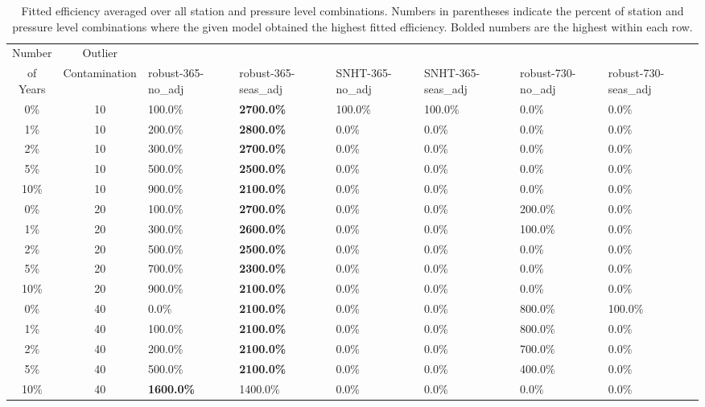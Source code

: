 \documentclass[12pt]{article}
\begin{document}
\begin{landscape}
\begin{table}[ht]
\centering
\begin{tabular}{cc|llllll}
  \hline
Number & Outlier & & & & & &\\ 
of Years & Contamination & robust-365-no\_adj &  robust-365-seas\_adj & SNHT-365-no\_adj &  SNHT-365-seas\_adj & robust-730-no\_adj & robust-730-seas\_adj\\ 

  \hline
0\% &  10 & 100.0\% & \textbf{2700.0\%} & 100.0\% & 100.0\% & 0.0\% & 0.0\% \\ 
1\% &  10 & 200.0\% & \textbf{2800.0\%} & 0.0\% & 0.0\% & 0.0\% & 0.0\% \\ 
2\% &  10 & 300.0\% & \textbf{2700.0\%} & 0.0\% & 0.0\% & 0.0\% & 0.0\% \\ 
5\% &  10 & 500.0\% & \textbf{2500.0\%} & 0.0\% & 0.0\% & 0.0\% & 0.0\% \\ 
10\% &  10 & 900.0\% & \textbf{2100.0\%} & 0.0\% & 0.0\% & 0.0\% & 0.0\% \\ 
0\% &  20 & 100.0\% & \textbf{2700.0\%} & 0.0\% & 0.0\% & 200.0\% & 0.0\% \\ 
1\% &  20 & 300.0\% & \textbf{2600.0\%} & 0.0\% & 0.0\% & 100.0\% & 0.0\% \\ 
2\% &  20 & 500.0\% & \textbf{2500.0\%} & 0.0\% & 0.0\% & 0.0\% & 0.0\% \\ 
5\% &  20 & 700.0\% & \textbf{2300.0\%} & 0.0\% & 0.0\% & 0.0\% & 0.0\% \\ 
10\% &  20 & 900.0\% & \textbf{2100.0\%} & 0.0\% & 0.0\% & 0.0\% & 0.0\% \\ 
0\% &  40 & 0.0\% & \textbf{2100.0\%} & 0.0\% & 0.0\% & 800.0\% & 100.0\% \\ 
1\% &  40 & 100.0\% & \textbf{2100.0\%} & 0.0\% & 0.0\% & 800.0\% & 0.0\% \\ 
2\% &  40 & 200.0\% & \textbf{2100.0\%} & 0.0\% & 0.0\% & 700.0\% & 0.0\% \\ 
5\% &  40 & 500.0\% & \textbf{2100.0\%} & 0.0\% & 0.0\% & 400.0\% & 0.0\% \\ 
10\% &  40 & \textbf{1600.0\%} & 1400.0\% & 0.0\% & 0.0\% & 0.0\% & 0.0\% \\ 
\hline
\end{tabular}
\caption{Fitted efficiency averaged over all station and pressure level combinations.  Numbers in parentheses indicate the percent of station and pressure level combinations where the given model obtained the highest fitted efficiency. Bolded numbers are the highest within each row.}
\label{tab:homOrd}
\end{table}
\end{landscape}
\end{document}
